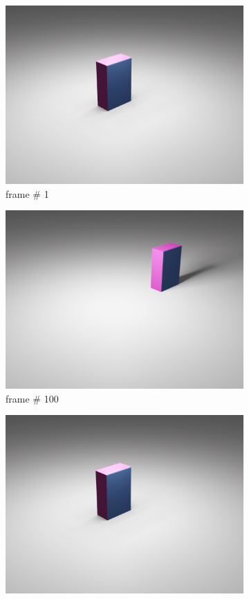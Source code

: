 \begin{figure}[ht]
\begin{subfigure}{.31\textwidth}
  \centering
  \includegraphics[width=.8\linewidth]{0001.png}  
  \caption{frame \# 1}
\end{subfigure}
\hfill
\begin{subfigure}{.31\textwidth}
  \centering
  \includegraphics[width=.8\linewidth]{0100.png}  
  \caption{frame \# 100}
\end{subfigure}
\hfill
\begin{subfigure}{.31\textwidth}
  \centering
  \includegraphics[width=.8\linewidth]{0200.png}  

\end{subfigure}
\end{figure}
